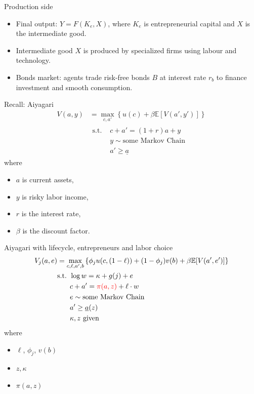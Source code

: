 \documentclass[aspectratio=169,mathserif]{beamer}
\begin{document}
\begin{frame}{Production side}
    \begin{itemize}
        \item Final output: $Y = F(K_e, X)$, where $K_e$ is entrepreneurial capital and $X$ is the intermediate good.
        \item Intermediate good $X$ is produced by specialized firms using labour and technology.
        \item Bonds market: agents trade risk-free bonds $B$ at interest rate $r_b$ to finance investment and smooth consumption.
    \end{itemize}
\end{frame}

\begin{frame}{Recall: Aiyagari}
    \begin{align*}
    V(a, y) &= \max_{c, a'} \left\{ u(c) + \beta \mathbb{E}[V(a', y')] \right\} \\
    &\begin{aligned} \text{s.t. } & c + a' = (1 + r) a + y
        \\
        &y \sim \text{some Markov Chain} \\
        &a' \geq \underline{a}
    \end{aligned}
    \end{align*}
    where
    \begin{itemize}
        \item $a$ is current assets,
        \item $y$ is risky labor income,
        \item $r$ is the interest rate,
        \item $\beta$ is the discount factor.
    \end{itemize}
\end{frame}

\begin{frame}{Aiyagari with lifecycle, entrepreneurs and labor choice}
    \begin{align*}
    V_j(a, e) &= \max_{c, \ell, a', b} \left\{\phi_j u(c, (1-\ell)) + (1-\phi_j)v(b) + \beta \mathbb{E}[V(a', e')] \right\} \\
    &\begin{aligned} \text{s.t. } 
        & \log w = \kappa + g(j) + e \\
        & c + a' = \textcolor{red}{\pi(a, z)} + \ell \cdot w \\
        & e \sim \text{some Markov Chain} \\
        &a' \geq \underline{a}(z) \\
        &\kappa, z \text{ given}
    \end{aligned}
    \end{align*}
    where
    \begin{itemize}
        \item $\ell$, $\phi_j$, $v(b)$
        \item $z, \kappa$
        \item $\pi(a, z)$
    \end{itemize}
\end{frame}
\end{document}
